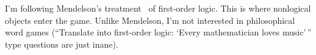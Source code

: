 \begin{node}\label{fol-0000}%
I'm following Mendelson's treatment~\cite{mendelson2015mathematical} of
first-order logic. This is where nonlogical objects enter the
game. Unlike Mendelson, I'm not interested in philosophical word games
(``Translate into first-order logic: `Every mathematician loves
music'\,'' type questions are just inane).
\end{node}
